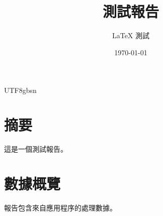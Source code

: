 \documentclass{article}
\title{測試報告}
\author{LaTeX 測試}
\date{\today}
\begin{document}
\begin{CJK*}{UTF8}{gbsn}
\maketitle
\section{摘要}
這是一個測試報告。
\section{數據概覽}
報告包含來自應用程序的處理數據。
\end{CJK*}
\end{document}
